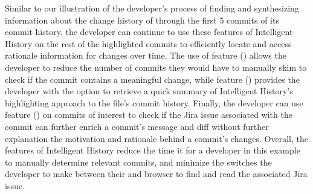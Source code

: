 Similar to our illustration of the developer's process of finding and synthesizing information about the 
change history of  through the first 5 commits of its commit history, 
the developer can continue to use these features of Intelligent History on the rest of the highlighted commits 
to efficiently locate and access rationale information for changes over time.
The use of feature () allows the developer to reduce the number of commits they would have 
to manually skim to check if the commit contains a meaningful change, while feature () provides the developer with the option to retrieve a quick summary of Intelligent History's highlighting approach to the file's commit history.
Finally, the developer can use feature () on commits of interest to check if the Jira issue 
associated with the commit can further enrich a commit's message and diff without further explanation  the motivation and rationale behind a commit's changes.
Overall, the features of Intelligent History reduce the time it  for a developer 
in this example to manually determine relevant commits, and  minimize the switches the developer  
to make between their  and browser to find and read the associated Jira issue.

\endinput

Any text after an \endinput is ignored.
You could put scraps here or things in progress.